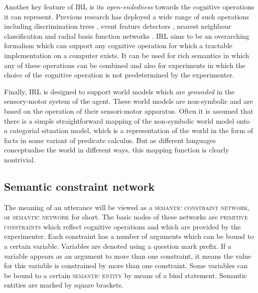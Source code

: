 Another key feature of IRL is its \emph{open-endedness} towards the
cognitive operations it can represent. Previous research has deployed
a wide range of such operations including discrimination trees
\citep{steels96perceptually}, event feature detectors
\citep{siskind01grounding}, nearest neighbour classification
\citep{belpaeme05explaining} and radial basis function networks
\citep{steels05coordinating}.  IRL aims to be an overarching formalism
which can support any cognitive operation for which a tractable
implementation on a computer exists. It can be used for rich semantics
in which any of these operations can be combined and also for
experiments in which the choice of the cognitive operation is not
predetermined by the experimenter.

Finally, IRL is designed to support world models which are
\emph{grounded} in the sensory-motor system of the agent. These world
models are non-symbolic and are based on the operation of their
sensori-motor apparatus. Often \citep[e.g.][]{batali02negotiation,
  smith03iterated, wellens08flexible} it is assumed that there is a
simple straightforward mapping of the non-symbolic world model onto a
categorial situation model, which is a representation of the world in
the form of facts in some variant of predicate calculus. But as
different languages conceptualise the world in different ways, this
mapping function is clearly nontrivial.

\subsection{Semantic constraint network}
\label{s:semantic-constraint-network}

The meaning of an utterance will be viewed as a \textsc{semantic
  constraint network}, or \textsc{semantic network} for short. The basic
nodes of these networks are \textsc{primitive
  constraints} which reflect cognitive
operations and which are provided by the experimenter.  Each
constraint has a number of arguments which can be bound to a certain
variable. Variables are denoted using a question mark prefix. If a
variable appears as an argument to more than one constraint, it means
the value for this variable is constrained by more than one
constraint. Some variables can be bound to a certain \textsc{semantic
  entity} by means of a bind
statement. Semantic entities are marked by square brackets.

